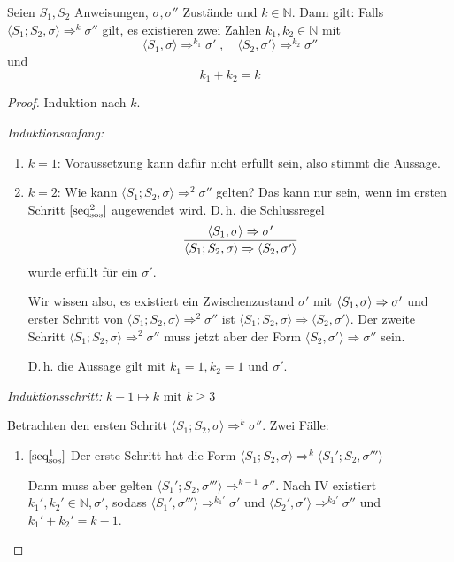 \begin{lemma}
    Seien $S_1, S_2$ Anweisungen, $\sigma, \sigma''$ Zustände und $k \in \mathbb{N}$.
    Dann gilt: Falls $\langle S_1; S_2, \sigma \rangle \Rightarrow^k \sigma''$ gilt, es existieren zwei Zahlen $k_1, k_2 \in \mathbb{N}$ mit
    \[
        \langle S_1, \sigma \rangle \Rightarrow^{k_1} \sigma'
        \;,\quad
        \langle S_2, \sigma' \rangle \Rightarrow^{k_2} \sigma''
    \]
    und
    \[
        k_1 + k_2 = k
    \]
\end{lemma}
\begin{proof}
    Induktion nach $k$.

    \emph{Induktionsanfang:}
    \begin{enumerate}
        \item $k = 1$: Voraussetzung kann dafür nicht erfüllt sein, also stimmt die Aussage.
        \item $k = 2$: Wie kann $\langle S_1; S_2, \sigma \rangle \Rightarrow^2 \sigma''$ gelten?
            Das kann nur sein, wenn im ersten Schritt $\infruleSos[2]{seq}$ augewendet wird. D.\,h. die Schlussregel
            \[
                \frac{\stranssos{S_1}{\sigma}{\sigma'}}{\stranssos{S_1; S_2}{\sigma}{\langle S_2, \sigma' \rangle}}
            \]
            wurde erfüllt für ein $\sigma'$.

            Wir wissen also, es existiert ein Zwischenzustand $\sigma'$ mit $\stranssos{S_1}{\sigma}{\sigma'}$ und erster Schritt von $\langle S_1; S_2, \sigma \rangle \Rightarrow^2 \sigma''$ ist $\langle S_1; S_2, \sigma \rangle \Rightarrow \langle S_2, \sigma' \rangle$.
            Der zweite Schritt $\langle S_1; S_2, \sigma \rangle \Rightarrow^2 \sigma''$ muss jetzt aber der Form $\langle S_2, \sigma' \rangle \Rightarrow \sigma''$ sein.

            D.\,h. die Aussage gilt mit $k_1 = 1, k_2 = 1$ und $\sigma'$.
    \end{enumerate}

        \par\bigskip
    \emph{Induktionsschritt:} $k - 1 \mapsto k$ mit $k \geq 3$

    Betrachten den ersten Schritt $\langle S_1; S_2, \sigma \rangle \Rightarrow^k \sigma''$.
    Zwei Fälle:
    \begin{enumerate}
        \item $\infruleSos[1]{seq}$ Der erste Schritt hat die Form $\langle S_1; S_2, \sigma \rangle \Rightarrow^k \langle S_1'; S_2, \sigma''' \rangle$

            Dann muss aber gelten $\langle S_1'; S_2, \sigma''' \rangle \Rightarrow^{k-1} \sigma''$.
            Nach IV existiert $k_1', k_2' \in \mathbb{N}, \sigma'$, sodass $\langle S_1',  \sigma''' \rangle \Rightarrow^{k_1'} \sigma'$ und $\langle S_2',  \sigma' \rangle \Rightarrow^{k_2'} \sigma''$ und $k_1' + k_2' = k - 1$.


\end{enumerate}
\end{proof}
